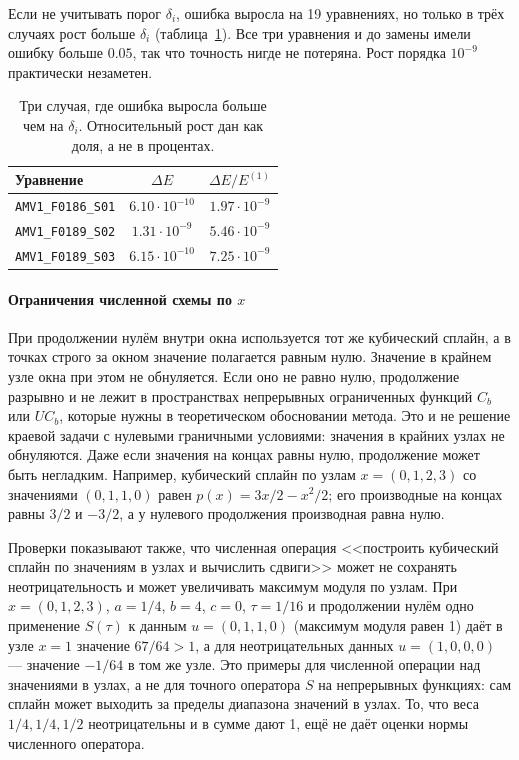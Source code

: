 \documentclass[14pt,a4paper]{extarticle}
\begin{document}
Если не учитывать порог $\delta_i$, ошибка выросла на 19 уравнениях,
но только в трёх случаях рост больше $\delta_i$
(таблица~\ref{tab:boundarydev-regressions}). Все три уравнения и до
замены имели ошибку больше $0.05$, так что точность нигде не потеряна.
Рост порядка $10^{-9}$ практически незаметен.

\begin{table}[!htbp]
\centering
\caption{Три случая, где ошибка выросла больше чем на $\delta_i$.
Относительный рост дан как доля, а не в процентах.}
\label{tab:boundarydev-regressions}
\small
\begin{tabular}{lcc}
\toprule
Уравнение & $\Delta E$ & $\Delta E/E^{(1)}$\\
\midrule
\texttt{AMV1\_F0186\_S01} & $6.10\cdot10^{-10}$ & $1.97\cdot10^{-9}$\\
\texttt{AMV1\_F0189\_S02} & $1.31\cdot10^{-9}$ & $5.46\cdot10^{-9}$\\
\texttt{AMV1\_F0189\_S03} & $6.15\cdot10^{-10}$ & $7.25\cdot10^{-9}$\\
\bottomrule
\end{tabular}
\end{table}

\paragraph{Ограничения численной схемы по $x$\\}
При продолжении нулём внутри окна используется тот же кубический
сплайн, а в точках строго за окном значение полагается равным нулю.
Значение в крайнем узле окна при этом не обнуляется. Если оно не равно
нулю, продолжение разрывно и не лежит в пространствах непрерывных
ограниченных функций $C_b$ или $UC_b$, которые нужны в теоретическом
обосновании метода. Это и не решение краевой задачи с нулевыми
граничными условиями: значения в крайних узлах не обнуляются. Даже если
значения на концах равны нулю, продолжение может быть негладким.
Например, кубический сплайн по узлам $x=(0,1,2,3)$ со значениями
$(0,1,1,0)$ равен $p(x)=3x/2-x^2/2$; его производные на концах равны
$3/2$ и $-3/2$, а у нулевого продолжения производная равна нулю.

Проверки показывают также, что численная операция <<построить
кубический сплайн по значениям в узлах и вычислить сдвиги>> может
не сохранять неотрицательность и может увеличивать максимум модуля
по узлам. При $x=(0,1,2,3)$, $a=1/4$, $b=4$, $c=0$, $\tau=1/16$
и продолжении нулём одно применение $S(\tau)$ к данным $u=(0,1,1,0)$
(максимум модуля равен 1) даёт в узле $x=1$ значение $67/64>1$, а для
неотрицательных данных $u=(1,0,0,0)$ --- значение $-1/64$ в том же
узле. Это примеры для численной операции над значениями в узлах,
а не для точного оператора $S$ на непрерывных функциях: сам сплайн
может выходить за пределы диапазона значений в узлах. То, что веса
$1/4,1/4,1/2$ неотрицательны и в сумме дают 1, ещё не даёт оценки
нормы численного оператора.
\end{document}
